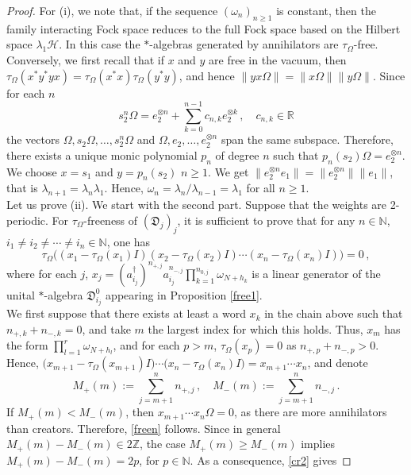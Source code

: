 \documentclass[12pt]{amsart}
\numberwithin{equation}{section}
\def\ch{{\mathcal H}}
\def\gd{{\mathfrak D}}
\def\bn{{\mathbb N}}
\def\br{{\mathbb R}}
\def\bz{{\mathbb Z}}
\def\t{\tau}
\def\om{\omega} \def\Om{\Omega}
\theoremstyle{definition}
\begin{document}
\begin{proof}
  For (i), we note that, if the sequence $(\omega_n)_{n\geq 1}$ is constant, then
  the family interacting Fock space reduces to the full Fock space based on the Hilbert space $\lambda_1\ch$. In this case the $*$-algebras generated by annihilators are $\t_\Om$-free.\\
Conversely, we first recall that if $x$ and $y$ are free in the vacuum, then
  $\tau_\Om(x^*y^*yx)=\tau_\Om(x^*x)\tau_\Om(y^*y)$, and hence $\|yx\Omega\|=\|x\Omega\|\|y\Omega\|$. Since for each $n$
$$
s_2^n\Om=e_2^{\otimes n}
+\sum_{k=0}^{n-1}c_{n,k}e_2^{\otimes k}\,, \quad c_{n,k}\in\br
$$
the vectors $\Om,s_2\Om,\ldots,s_2^n\Om$ and $\Om,e_2,\ldots,e_2^{\otimes n}$
span the same subspace. Therefore, there exists a unique monic polynomial
$p_n$ of degree $n$ such that $p_n(s_2)\Om=e_2^{\otimes n}$. We choose $x=s_1$ and $y=p_n(s_2)$ %
  $n\geq 1$. We get $\|e_{2}^{\otimes n}e_1\|=\|e_{2}^{\otimes n}\|\|e_1\|$, that is $\lambda_{n+1}=\lambda_n\lambda_1$. Hence, $\omega_n=\lambda_n/\lambda_{n-1}=\lambda_1$ for all $n\geq 1$.\\
Let us prove (ii). We start with the second part. Suppose that the weights are 2-periodic. For $\t_\Om$-freeness of $(\gd_j)_j$, it is sufficient to prove that for any $n\in\bn$, $i_1\neq i_2\neq \cdots\neq i_n\in\bn$, one has
\begin{equation}\label{freen}
\t_\Om\big((x_1-\t_\Om(x_1)I)(x_2-\t_\Om(x_2)I)\cdots (x_n-\t_\Om(x_n)I)\big)=0\,,
\end{equation}
where for each $j$, $x_j=(a_{i_j}^\dag)^{n_{+,j}}a_{i_j}^{n_{-,j}}\prod_{k=1}^{n_{0,j}}\om_{N+h_k}$ is a linear generator
of the unital $*$-algebra $\gd^0_{i_j}$ appearing in Proposition \ref{free1}. \\
We first suppose that there exists at least a word $x_k$ in the chain
above such that $n_{+,k}+n_{-,k}=0$, and take $m$ the largest index
for which this holds. Thus, $x_m$ has the form
$\displaystyle{\prod_{l=1}^r\om_{N+h_l}}$, and for each $p>m$,
$\t_\Om(x_p)=0$ as $n_{+,p}+n_{-,p}>0$. Hence,
$\big(x_{m+1}-\t_\Om(x_{m+1})I\big)\cdots\big(x_{n}-\t_\Om(x_{n})I\big)=x_{m+1}\cdots
x_n$, and denote
$$
\displaystyle{M_+(m):=\sum_{j=m+1}^n n_{+,j}}\,, \quad \displaystyle{M_-(m):=\sum_{j=m+1}^n n_{-,j}}\,.
$$
If $M_+(m)<M_-(m)$, then $x_{m+1}\cdots x_n\Om=0$, as there are more annihilators than creators. Therefore, \eqref{freen} follows. Since in general $M_+(m)-M_-(m)\in 2\bz$, the case $M_+(m)\geq M_-(m)$ implies $M_+(m)-M_-(m)=2p$, for $p\in\bn$. As a consequence, \eqref{cr2} gives

\end{proof}
\end{document}
